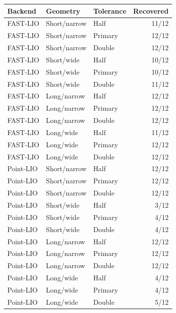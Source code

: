 \begin{tabular}{@{}lllr@{}}
\toprule
Backend & Geometry & Tolerance & Recovered\\\midrule
FAST-LIO & Short/narrow & Half & 11/12\\
FAST-LIO & Short/narrow & Primary & 12/12\\
FAST-LIO & Short/narrow & Double & 12/12\\
FAST-LIO & Short/wide & Half & 10/12\\
FAST-LIO & Short/wide & Primary & 10/12\\
FAST-LIO & Short/wide & Double & 11/12\\
FAST-LIO & Long/narrow & Half & 12/12\\
FAST-LIO & Long/narrow & Primary & 12/12\\
FAST-LIO & Long/narrow & Double & 12/12\\
FAST-LIO & Long/wide & Half & 11/12\\
FAST-LIO & Long/wide & Primary & 12/12\\
FAST-LIO & Long/wide & Double & 12/12\\
Point-LIO & Short/narrow & Half & 12/12\\
Point-LIO & Short/narrow & Primary & 12/12\\
Point-LIO & Short/narrow & Double & 12/12\\
Point-LIO & Short/wide & Half & 3/12\\
Point-LIO & Short/wide & Primary & 4/12\\
Point-LIO & Short/wide & Double & 4/12\\
Point-LIO & Long/narrow & Half & 12/12\\
Point-LIO & Long/narrow & Primary & 12/12\\
Point-LIO & Long/narrow & Double & 12/12\\
Point-LIO & Long/wide & Half & 4/12\\
Point-LIO & Long/wide & Primary & 4/12\\
Point-LIO & Long/wide & Double & 5/12\\
\bottomrule
\end{tabular}
